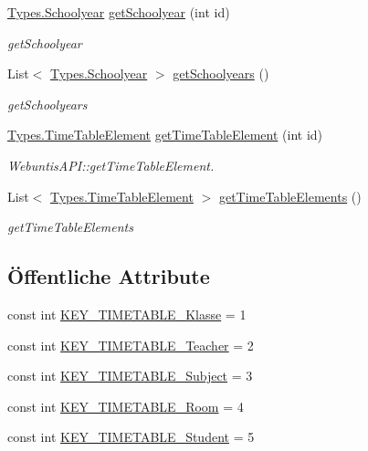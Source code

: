 \begin{DoxyCompactItemize}
\item 
\hyperlink{struct_webuntis_a_p_i_1_1_types_1_1_schoolyear}{Types.\-Schoolyear} \hyperlink{class_webuntis_a_p_i_1_1_web_untis_a_p_i_a098a31245679e053a3ea4ed24a682917}{get\-Schoolyear} (int id)
\begin{DoxyCompactList}\small\item\em get\-Schoolyear \end{DoxyCompactList}\item 
List$<$ \hyperlink{struct_webuntis_a_p_i_1_1_types_1_1_schoolyear}{Types.\-Schoolyear} $>$ \hyperlink{class_webuntis_a_p_i_1_1_web_untis_a_p_i_a2d8d22c88e987371e5215d0e191e6fd1}{get\-Schoolyears} ()
\begin{DoxyCompactList}\small\item\em get\-Schoolyears \end{DoxyCompactList}\item 
\hyperlink{struct_webuntis_a_p_i_1_1_types_1_1_time_table_element}{Types.\-Time\-Table\-Element} \hyperlink{class_webuntis_a_p_i_1_1_web_untis_a_p_i_ab65edf15b17f3d493d1145f746939db5}{get\-Time\-Table\-Element} (int id)
\begin{DoxyCompactList}\small\item\em Webuntis\-A\-P\-I\-::get\-Time\-Table\-Element. \end{DoxyCompactList}\item 
List$<$ \hyperlink{struct_webuntis_a_p_i_1_1_types_1_1_time_table_element}{Types.\-Time\-Table\-Element} $>$ \hyperlink{class_webuntis_a_p_i_1_1_web_untis_a_p_i_a3c70ef5f1c3785c9ce61724b8456922b}{get\-Time\-Table\-Elements} ()
\begin{DoxyCompactList}\small\item\em get\-Time\-Table\-Elements \end{DoxyCompactList}\end{DoxyCompactItemize}
\subsection*{Öffentliche Attribute}
\begin{DoxyCompactItemize}
\item 
const int \hyperlink{class_webuntis_a_p_i_1_1_web_untis_a_p_i_a878b0a3caa3dd47413b6b6de7928319a}{K\-E\-Y\-\_\-\-T\-I\-M\-E\-T\-A\-B\-L\-E\-\_\-\-Klasse} = 1
\item 
const int \hyperlink{class_webuntis_a_p_i_1_1_web_untis_a_p_i_ad93ea508e78c71d5b4a97bab65322115}{K\-E\-Y\-\_\-\-T\-I\-M\-E\-T\-A\-B\-L\-E\-\_\-\-Teacher} = 2
\item 
const int \hyperlink{class_webuntis_a_p_i_1_1_web_untis_a_p_i_a675f0bc99b9300bfb0b582df0b1fd5a7}{K\-E\-Y\-\_\-\-T\-I\-M\-E\-T\-A\-B\-L\-E\-\_\-\-Subject} = 3
\item 
const int \hyperlink{class_webuntis_a_p_i_1_1_web_untis_a_p_i_a71c1728202672867d91eaac73fdf8d26}{K\-E\-Y\-\_\-\-T\-I\-M\-E\-T\-A\-B\-L\-E\-\_\-\-Room} = 4
\item 
const int \hyperlink{class_webuntis_a_p_i_1_1_web_untis_a_p_i_a3e09c1c77ac67a2dd3065737213b775e}{K\-E\-Y\-\_\-\-T\-I\-M\-E\-T\-A\-B\-L\-E\-\_\-\-Student} = 5
\end{DoxyCompactItemize}


